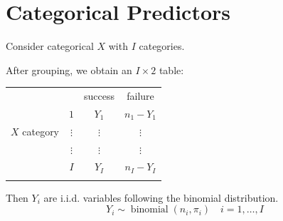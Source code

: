 \documentclass[11pt]{elegantbook}
\begin{document}
\section{Categorical Predictors}
Consider categorical $X$ with $I$ categories.

After grouping, we obtain an $I \times 2$ table:

\begin{center}
    \begin{tabular}{cc|c|c|}
        \multicolumn{2}{c}{ } & \multicolumn{1}{c}{ success } & \multicolumn{1}{c}{ failure } \\
        \cline { 3 - 4 } & $1$ & $Y_1$ & $n_1-Y_1$ \\
        $X$ category & $\vdots$ & $\vdots$ & $\vdots$ \\
        & $\vdots$ & $\vdots$ & $\vdots$ \\
        & $I$ & $Y_I$ & $n_I-Y_I$ \\
        \cline { 3 - 4 }
        \multicolumn{2}{c}{ } & \multicolumn{1}{c}{ } & \multicolumn{1}{c}{} \\
    \end{tabular}
\end{center}
Then $Y_i$ are i.i.d. variables following the binomial distribution.
$$
Y_i \sim \operatorname{binomial}\left(n_i, \pi_i\right) \quad i=1, \ldots, I
$$
\end{document}
